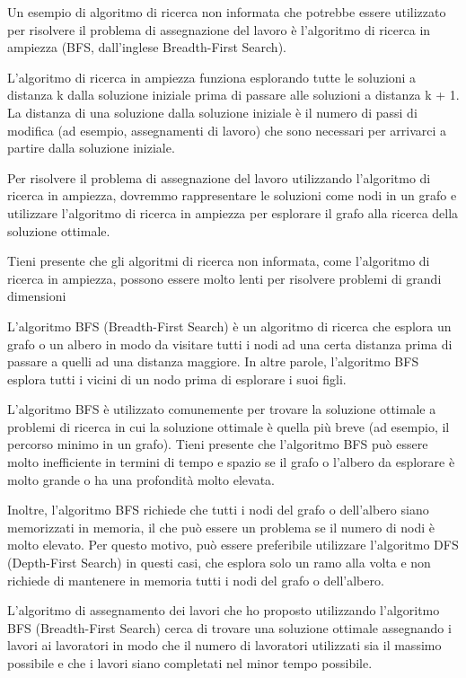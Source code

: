 Un esempio di algoritmo di ricerca non informata che potrebbe essere utilizzato per risolvere il problema di assegnazione del lavoro è l'algoritmo di ricerca in ampiezza (BFS, dall'inglese Breadth-First Search).

L'algoritmo di ricerca in ampiezza funziona esplorando tutte le soluzioni a distanza k dalla soluzione iniziale prima di passare alle soluzioni a distanza k + 1. La distanza di una soluzione dalla soluzione iniziale è il numero di passi di modifica (ad esempio, assegnamenti di lavoro) che sono necessari per arrivarci a partire dalla soluzione iniziale.

Per risolvere il problema di assegnazione del lavoro utilizzando l'algoritmo di ricerca in ampiezza, dovremmo rappresentare le soluzioni come nodi in un grafo e utilizzare l'algoritmo di ricerca in ampiezza per esplorare il grafo alla ricerca della soluzione ottimale.

Tieni presente che gli algoritmi di ricerca non informata, come l'algoritmo di ricerca in ampiezza, possono essere molto lenti per risolvere problemi di grandi dimensioni


L'algoritmo BFS (Breadth-First Search) è un algoritmo di ricerca che esplora un grafo o un albero in modo da visitare tutti i nodi ad una certa distanza prima di passare a quelli ad una distanza maggiore. In altre parole, l'algoritmo BFS esplora tutti i vicini di un nodo prima di esplorare i suoi figli.

L'algoritmo BFS è utilizzato comunemente per trovare la soluzione ottimale a problemi di ricerca in cui la soluzione ottimale è quella più breve (ad esempio, il percorso minimo in un grafo). Tieni presente che l'algoritmo BFS può essere molto inefficiente in termini di tempo e spazio se il grafo o l'albero da esplorare è molto grande o ha una profondità molto elevata.

Inoltre, l'algoritmo BFS richiede che tutti i nodi del grafo o dell'albero siano memorizzati in memoria, il che può essere un problema se il numero di nodi è molto elevato. Per questo motivo, può essere preferibile utilizzare l'algoritmo DFS (Depth-First Search) in questi casi, che esplora solo un ramo alla volta e non richiede di mantenere in memoria tutti i nodi del grafo o dell'albero.

L'algoritmo di assegnamento dei lavori che ho proposto utilizzando l'algoritmo BFS (Breadth-First Search) cerca di trovare una soluzione ottimale assegnando i lavori ai lavoratori in modo che il numero di lavoratori utilizzati sia il massimo possibile e che i lavori siano completati nel minor tempo possibile.

